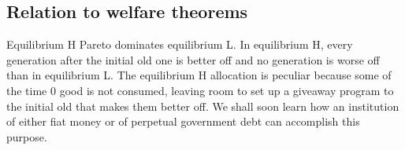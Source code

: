 


\medskip
\subsection{Relation to welfare theorems}
Equilibrium H Pareto dominates
equilibrium L.  In equilibrium H, every generation after the initial
old one is better off and no generation is worse off than in equilibrium
L.
The equilibrium H allocation
is peculiar because some of the time $0$ good is not consumed, leaving
 room to set up a giveaway program to the initial
old that makes them better off.  We shall soon learn how an institution of either fiat money or of perpetual government debt 
can accomplish this purpose.

